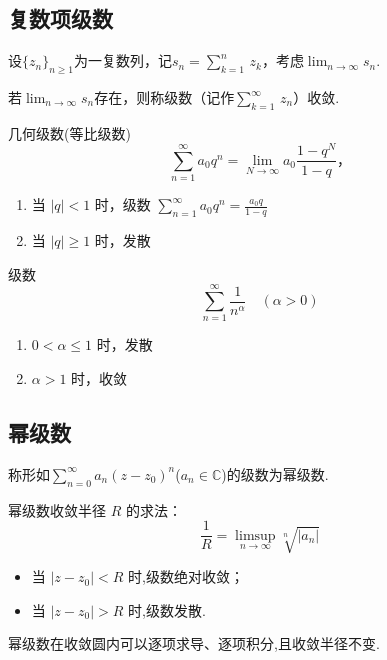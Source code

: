 \documentclass[openany,oneside]{ctexbook}
\begin{document}
\subsection{复数项级数}
\begin{definition}
  设$\{z_n\}_{n\ge 1}$为一复数列，记$s_n = \sum_{k = 1}^{n}\,z_k$，考虑$\lim_{n\to\infty}s_n$.

  若$\lim_{n\to\infty}s_n$存在，则称级数（记作$\sum_{k = 1}^{\infty}\,z_n$）收敛.
\end{definition}
\begin{example}
几何级数(等比级数)
\[
\sum_{n=1}^{\infty} a_0 q^n = \lim_{N \to \infty} a_0 \frac{1 - q^N}{1 - q}，
\]
\begin{enumerate}
    \item 当 \(|q| < 1\) 时，级数 \(\displaystyle \sum_{n=1}^{\infty} a_0 q^n = \frac{a_0 q}{1 - q}\)
    \item 当 \(|q| \ge 1\) 时，发散
\end{enumerate}
\end{example}
\begin{example}
级数
\[
\sum_{n=1}^{\infty} \frac{1}{n^\alpha} \quad (\alpha > 0)
\]
\begin{enumerate}
    \item \(0 < \alpha \le 1\) 时，发散
    \item \(\alpha > 1\) 时，收敛
\end{enumerate}
\end{example}
\subsection{幂级数}

\begin{definition}
  称形如$\sum_{n=0}^\infty a_n(z - z_0)^n$($a_n \in \mathbb{C}$)的级数为幂级数.
\end{definition}
\begin{theorem}[根植判别法]
  幂级数收敛半径 $R$ 的求法：
\[
\frac{1}{R} = \limsup_{n \to \infty} \sqrt[n]{|a_n|}
\]

\begin{itemize}
  \item 当 $|z - z_0| < R$ 时,级数绝对收敛；
  \item 当 $|z - z_0| > R$ 时,级数发散.
\end{itemize}
\end{theorem}

\begin{theorem}
    幂级数在收敛圆内可以逐项求导、逐项积分,且收敛半径不变.
\end{theorem}
\end{document}
